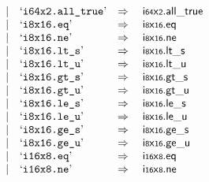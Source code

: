 $$\begin{array}[t]{@{}lrrl@{}l@{}l@{}l@{}}
& & | & \mbox{‘\texttt{i64x2.all\_true}’} & \quad\Rightarrow\quad{} & {\mathsf{i{\scriptstyle 64}}}{\mathsf{x}}{\mathsf{{\scriptstyle 2}}} {.} \mathsf{all\_true} \\
& & | & \mbox{‘\texttt{i8x16.eq}’} & \quad\Rightarrow\quad{} & {\mathsf{i{\scriptstyle 8}}}{\mathsf{x}}{\mathsf{{\scriptstyle 16}}} {.} \mathsf{eq} \\
& & | & \mbox{‘\texttt{i8x16.ne}’} & \quad\Rightarrow\quad{} & {\mathsf{i{\scriptstyle 8}}}{\mathsf{x}}{\mathsf{{\scriptstyle 16}}} {.} \mathsf{ne} \\
& & | & \mbox{‘\texttt{i8x16.lt\_s}’} & \quad\Rightarrow\quad{} & {\mathsf{i{\scriptstyle 8}}}{\mathsf{x}}{\mathsf{{\scriptstyle 16}}} {.} {\mathsf{lt}}{\mathsf{\_}}{\mathsf{s}} \\
& & | & \mbox{‘\texttt{i8x16.lt\_u}’} & \quad\Rightarrow\quad{} & {\mathsf{i{\scriptstyle 8}}}{\mathsf{x}}{\mathsf{{\scriptstyle 16}}} {.} {\mathsf{lt}}{\mathsf{\_}}{\mathsf{u}} \\
& & | & \mbox{‘\texttt{i8x16.gt\_s}’} & \quad\Rightarrow\quad{} & {\mathsf{i{\scriptstyle 8}}}{\mathsf{x}}{\mathsf{{\scriptstyle 16}}} {.} {\mathsf{gt}}{\mathsf{\_}}{\mathsf{s}} \\
& & | & \mbox{‘\texttt{i8x16.gt\_u}’} & \quad\Rightarrow\quad{} & {\mathsf{i{\scriptstyle 8}}}{\mathsf{x}}{\mathsf{{\scriptstyle 16}}} {.} {\mathsf{gt}}{\mathsf{\_}}{\mathsf{u}} \\
& & | & \mbox{‘\texttt{i8x16.le\_s}’} & \quad\Rightarrow\quad{} & {\mathsf{i{\scriptstyle 8}}}{\mathsf{x}}{\mathsf{{\scriptstyle 16}}} {.} {\mathsf{le}}{\mathsf{\_}}{\mathsf{s}} \\
& & | & \mbox{‘\texttt{i8x16.le\_u}’} & \quad\Rightarrow\quad{} & {\mathsf{i{\scriptstyle 8}}}{\mathsf{x}}{\mathsf{{\scriptstyle 16}}} {.} {\mathsf{le}}{\mathsf{\_}}{\mathsf{u}} \\
& & | & \mbox{‘\texttt{i8x16.ge\_s}’} & \quad\Rightarrow\quad{} & {\mathsf{i{\scriptstyle 8}}}{\mathsf{x}}{\mathsf{{\scriptstyle 16}}} {.} {\mathsf{ge}}{\mathsf{\_}}{\mathsf{s}} \\
& & | & \mbox{‘\texttt{i8x16.ge\_u}’} & \quad\Rightarrow\quad{} & {\mathsf{i{\scriptstyle 8}}}{\mathsf{x}}{\mathsf{{\scriptstyle 16}}} {.} {\mathsf{ge}}{\mathsf{\_}}{\mathsf{u}} \\
& & | & \mbox{‘\texttt{i16x8.eq}’} & \quad\Rightarrow\quad{} & {\mathsf{i{\scriptstyle 16}}}{\mathsf{x}}{\mathsf{{\scriptstyle 8}}} {.} \mathsf{eq} \\
& & | & \mbox{‘\texttt{i16x8.ne}’} & \quad\Rightarrow\quad{} & {\mathsf{i{\scriptstyle 16}}}{\mathsf{x}}{\mathsf{{\scriptstyle 8}}} {.} \mathsf{ne} \\

\end{array}$$

